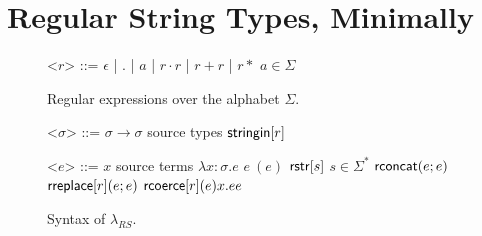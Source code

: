 \documentclass[9pt]{sig-alternate}
\theoremstyle{definition}
\newcommand{\sisubst}[3]{{\sf rreplace}[#1](#2;#3)} \newcommand{\rreplace}[3]{{\sf rreplace}[#1](#2;#3)} %
\newcommand{\coerce}[2]{ {\sf rcoerce}[#1](#2)}
\newcommand{\sistr}[1]{{\sf rstr}[#1]}   \newcommand{\rstr}[1]{{\sf rstr}[#1]} %
\newcommand{\strin}[1]{\sistr{#1}}
\newcommand{\rsconcat}[2]{{\sf rconcat}(#1;#2)} \newcommand{\rconcat}[2]{{\sf rconcat}(#1;#2)} %
\newcommand{\stringin}[1]{{\sf stringin}[#1]}
\begin{document}
\section{Regular String Types, Minimally}\label{calculus}
\renewcommand{\grammarlabel}[2]{#1\hfill#2}

\begin{figure}[t]
\begin{grammar}
<$r$> ::= $\epsilon$ | $.$ | $a$ | $r \cdot r$ | $r + r$ | $r*$ \hfill $a \in \Sigma$

\caption{Regular expressions over the alphabet $\Sigma$.}
\label{fig:regex}
\end{grammar}
\end{figure}

\begin{figure}[t]
\begin{grammar}

<$\sigma$> ::=  $\sigma \rightarrow \sigma$     \hfill  source types          \alt
$\stringin{r}$         

<$e$> ::= 
      $x$ \hfill source terms \alt 
      $\lambda x {:} \sigma . e$ \alt
      $e~(e)$ \alt
      $\strin{s}$ \hfill $s \in \Sigma^{*}$ \alt
      $\rsconcat{e}{e}$ \alt
      $\sisubst{r}{e}{e}$ \alt
      $\coerce{r}{e}{x.e}{e}$
\caption{Syntax of $\lambda_{RS}$.}\label{fig:lamrs}
\end{grammar}
\end{figure}


\newcommand{\sctx}{\Psi} %
\newcommand{\tctx}{\Theta} %

\newcommand{\ereduces}{\Downarrow}
\end{document}
